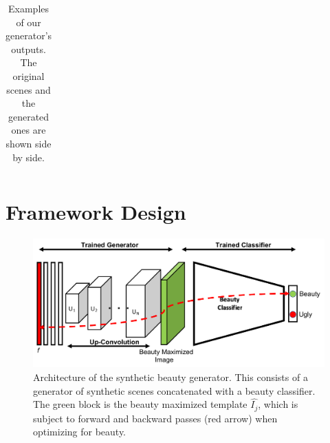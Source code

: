 \begin{table}
\begin{centering}
\begin{tabular}{l*2{C}@{}}
            \bottomrule 
        \end{tabular}
        \caption{Examples of our generator's outputs. The original scenes and the generated ones are shown side by side.}
        \label{fig:GanExample}
        
    \end{centering}
\end{table} 

\section{Framework Design}



\begin{figure}[t!]
    \centering
    \includegraphics[width=\columnwidth]{AM_arch.pdf}
    \caption{Architecture of the synthetic beauty generator. This consists of a generator of synthetic scenes concatenated with a beauty classifier. The green block is the beauty maximized template $\hat{I_j}$, which is subject to  forward and backward passes (red arrow) when optimizing for beauty.}
    \label{fig:AM_arch}
\end{figure}

\begin{table}[t]
    \caption{List of notations}\label{notations}
\end{table}

